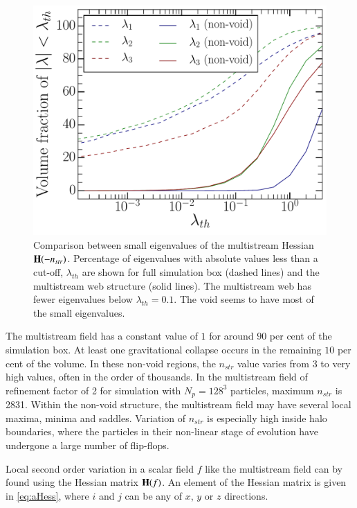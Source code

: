 \begin{figure}
\begin{minipage}[t]{.99\linewidth}
  \centering\includegraphics[width=10.cm]{Chapter4/Source_v2/fig7.pdf} 

\end{minipage}\hfill
\caption{Comparison between small eigenvalues of the multistream Hessian ${\bf H}(-n_{str})$. Percentage of eigenvalues with absolute values less than a cut-off, $\lambda_{th}$ are shown for full simulation box (dashed lines) and the multistream web structure (solid lines). The multistream web has fewer eigenvalues below $\lambda_{th} = 0.1$. The void seems to have most of the small eigenvalues. } 
\label{fig:lambdasSmall}
\end{figure}


The multistream field has a constant value of $1$ for around $90$ per cent of the simulation box. At least one gravitational collapse occurs in the remaining $10$ per cent of the volume. In these non-void regions, the $n_{str}$ value varies from 3 to very high values, often in the order of thousands. In the multistream field of refinement factor of 2 for simulation with $N_p = 128^3$ particles, maximum $n_{str}$ is 2831. Within the non-void structure, the multistream field may have several local maxima, minima and saddles. Variation of $n_{str}$ is especially high inside halo boundaries, where the particles in their non-linear stage of evolution have undergone a large number of flip-flops.  

Local second order variation in a scalar field $f$ like the multistream field can by found using the Hessian matrix ${\bf H}(f)$. An element of the Hessian matrix is given in \autoref{eq:aHess}, where $i$ and $j$ can be any of $x$, $y$ or $z$ directions.  

